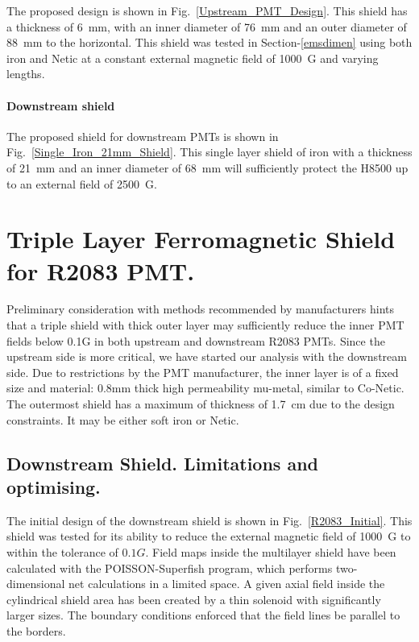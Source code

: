 \documentclass[12pt]{article}
\begin{document}
The proposed design
is shown  in Fig.~\ref{Upstream_PMT_Design}. This  shield has
a thickness of 6~mm, with an inner diameter of 76~mm and an outer 
diameter of 88~mm to the horizontal. This shield  was tested 
in Section-\ref{emsdimen} using both iron and Netic at a constant
external magnetic field of 1000~G and varying lengths.

\paragraph{Downstream shield}
The proposed shield for  downstream PMTs is shown in
Fig.~\ref{Single_Iron_21mm_Shield}. 
This single layer shield of iron with 
a thickness of 21~mm and an inner diameter of 68~mm will sufficiently protect 
the H8500 up to an external  field of 2500~G. 
\section{Triple Layer Ferromagnetic Shield for R2083 PMT.}
\label{tlfs}
Preliminary consideration with  methods recommended by manufacturers
hints that a triple shield with thick outer layer may  sufficiently reduce 
the inner PMT  fields below 0.1G  in both  upstream and downstream R2083 PMTs.
Since the upstream side is more critical, we have started our analysis with the 
downstream  side. Due to restrictions by the  PMT manufacturer, the inner layer 
is of a fixed size and material: 0.8mm thick 
high permeability mu-metal, similar to  Co-Netic. 
The outermost shield has a maximum of thickness of 1.7~cm due to 
the design constraints. It may be either soft iron or Netic.


\subsection{Downstream Shield. Limitations and  optimising.}

The initial design of  the  downstream  shield  is 
shown  in Fig.~\ref{R2083_Initial}.
This shield  was  tested for its ability to reduce the external magnetic field of 1000~G 
to within the tolerance of $0.1G$. Field maps inside the multilayer shield have been 
calculated with  the POISSON-Superfish  program, which performs two-dimensional net 
calculations in a limited space. A given axial field inside the cylindrical shield  
area has been created by a thin solenoid with  significantly larger sizes.
The boundary conditions enforced that the field lines be parallel to the borders.
 
\end{document}
